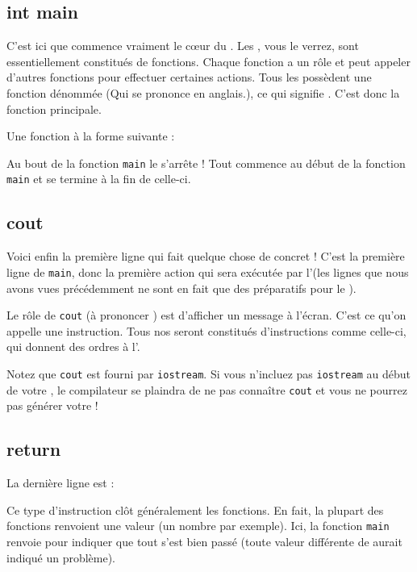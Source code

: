 \subsection{int main}
C'est ici que commence vraiment le cœur du \prog. Les \progs, vous le verrez, sont essentiellement constitués de fonctions. Chaque fonction a un rôle et peut appeler d'autres fonctions pour effectuer certaines actions.
Tous les \progs possèdent une fonction dénommée  (Qui se prononce  en anglais.), ce qui signifie . C'est donc la fonction principale.

Une fonction à la forme suivante :


Au bout de la fonction \lstinline|main| le \prog s'arrête ! Tout \prog commence au début de la fonction \lstinline|main| et se termine à la fin de celle-ci.

\subsection{cout}
Voici enfin la première ligne qui fait quelque chose de concret ! C'est la première ligne de \lstinline|main|, donc la première action qui sera exécutée par l'\ordi (les lignes que nous avons vues précédemment ne sont en fait que des préparatifs pour le \prog).

Le rôle de \lstinline|cout| (à prononcer ) est d'afficher un message à l'écran. C'est ce qu'on appelle une instruction. Tous nos \progs seront constitués d'instructions comme celle-ci, qui donnent des ordres à l'\ordi.

Notez que \lstinline|cout| est fourni par \lstinline|iostream|. Si vous n'incluez pas \lstinline|iostream| au début de votre \prog, le compilateur se plaindra de ne pas connaître \lstinline|cout| et vous ne pourrez pas générer votre \prog !

\subsection{return}
La dernière ligne est :

Ce type d'instruction clôt généralement les fonctions. En fait, la plupart des fonctions renvoient une valeur (un nombre par exemple). Ici, la fonction \lstinline|main| renvoie  pour indiquer que tout s'est bien passé (toute valeur différente de  aurait indiqué un problème).

